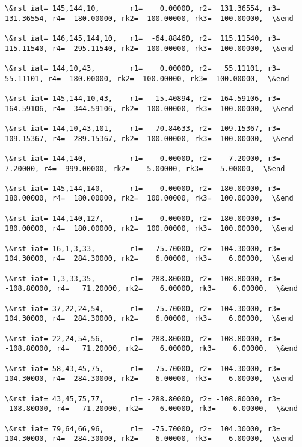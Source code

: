 \documentclass[11pt]{article}
\begin{document}
\begin{Verbatim}[commandchars=\\\{\}]
\&rst iat= 145,144,10,       r1=    0.00000, r2=  131.36554, r3=  131.36554, r4=  180.00000, rk2=  100.00000, rk3=  100.00000,  \&end

\&rst iat= 146,145,144,10,   r1=  -64.88460, r2=  115.11540, r3=  115.11540, r4=  295.11540, rk2=  100.00000, rk3=  100.00000,  \&end

\&rst iat= 144,10,43,        r1=    0.00000, r2=   55.11101, r3=   55.11101, r4=  180.00000, rk2=  100.00000, rk3=  100.00000,  \&end

\&rst iat= 145,144,10,43,    r1=  -15.40894, r2=  164.59106, r3=  164.59106, r4=  344.59106, rk2=  100.00000, rk3=  100.00000,  \&end

\&rst iat= 144,10,43,101,    r1=  -70.84633, r2=  109.15367, r3=  109.15367, r4=  289.15367, rk2=  100.00000, rk3=  100.00000,  \&end

\&rst iat= 144,140,          r1=    0.00000, r2=    7.20000, r3=    7.20000, r4=  999.00000, rk2=    5.00000, rk3=    5.00000,  \&end

\&rst iat= 145,144,140,      r1=    0.00000, r2=  180.00000, r3=  180.00000, r4=  180.00000, rk2=  100.00000, rk3=  100.00000,  \&end

\&rst iat= 144,140,127,      r1=    0.00000, r2=  180.00000, r3=  180.00000, r4=  180.00000, rk2=  100.00000, rk3=  100.00000,  \&end

\&rst iat= 16,1,3,33,        r1=  -75.70000, r2=  104.30000, r3=  104.30000, r4=  284.30000, rk2=    6.00000, rk3=    6.00000,  \&end

\&rst iat= 1,3,33,35,        r1= -288.80000, r2= -108.80000, r3= -108.80000, r4=   71.20000, rk2=    6.00000, rk3=    6.00000,  \&end

\&rst iat= 37,22,24,54,      r1=  -75.70000, r2=  104.30000, r3=  104.30000, r4=  284.30000, rk2=    6.00000, rk3=    6.00000,  \&end

\&rst iat= 22,24,54,56,      r1= -288.80000, r2= -108.80000, r3= -108.80000, r4=   71.20000, rk2=    6.00000, rk3=    6.00000,  \&end

\&rst iat= 58,43,45,75,      r1=  -75.70000, r2=  104.30000, r3=  104.30000, r4=  284.30000, rk2=    6.00000, rk3=    6.00000,  \&end

\&rst iat= 43,45,75,77,      r1= -288.80000, r2= -108.80000, r3= -108.80000, r4=   71.20000, rk2=    6.00000, rk3=    6.00000,  \&end

\&rst iat= 79,64,66,96,      r1=  -75.70000, r2=  104.30000, r3=  104.30000, r4=  284.30000, rk2=    6.00000, rk3=    6.00000,  \&end


\end{Verbatim}
\end{document}
